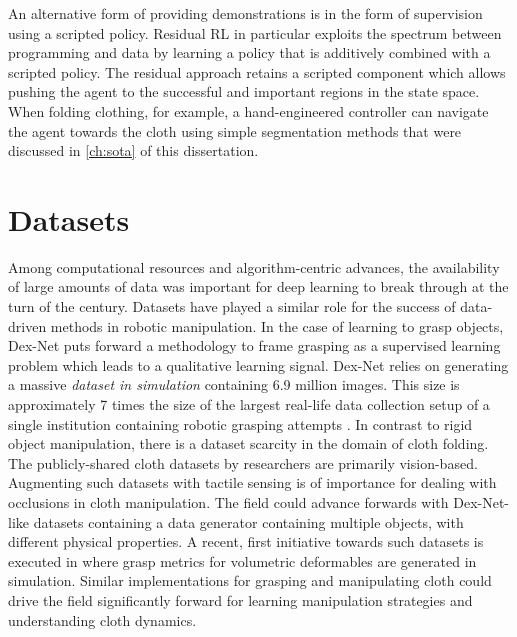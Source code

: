 \documentclass[\home/main.tex]{subfiles}
\begin{document}
An alternative form of providing demonstrations is in the form of supervision using a scripted policy. Residual RL in particular exploits the spectrum between programming and data by learning a policy that is additively combined with a scripted policy. The residual approach retains a scripted component which allows pushing the agent to the successful and important regions in the state space. When folding clothing, for example, a hand-engineered controller can navigate the agent towards the cloth using simple segmentation methods that were discussed in \cref{ch:sota} of this dissertation. 

\section{Datasets}

Among computational resources and algorithm-centric advances, the availability of large amounts of data was important for deep learning to break through at the turn of the century. Datasets have played a similar role for the success of data-driven methods in robotic manipulation. In the case of learning to grasp objects, Dex-Net \autocite{dexnet2} puts forward a methodology to frame grasping as a supervised learning problem which leads to a qualitative learning signal. Dex-Net relies on generating a massive \emph{dataset in simulation} containing 6.9 million images. This size is approximately 7 times the size of the largest real-life data collection setup of a single institution containing robotic grasping attempts \autocite{Levine2016}. In contrast to rigid object manipulation, there is a dataset scarcity in the domain of cloth folding. The publicly-shared cloth datasets by researchers are primarily vision-based. Augmenting such datasets with tactile sensing is of importance for dealing with occlusions in cloth manipulation. The field could advance forwards with Dex-Net-like datasets containing a data generator containing multiple objects, with different physical properties. A recent, first initiative towards such datasets is executed in \textcite{DefGraspSim} where grasp metrics for volumetric deformables are generated in simulation. Similar implementations for grasping and manipulating cloth could drive the field significantly forward for learning manipulation strategies and understanding cloth dynamics. 
\end{document}
